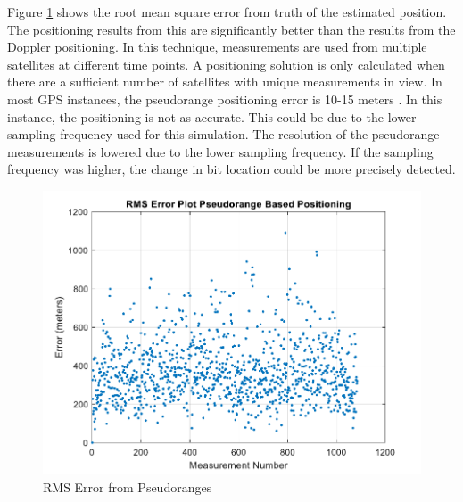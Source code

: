 \documentclass[12pt]{report}
\begin{document}
Figure \ref{fig:CleanPseudo15minIridRSME} shows the root mean square error from truth of the estimated position. The positioning results from this are significantly better than the results from the Doppler positioning. In this technique, measurements are used from multiple satellites at different time points. A positioning solution is only calculated when there are a sufficient number of satellites with unique measurements in view. In most GPS instances, the pseudorange positioning error is 10-15 meters \cite{misraGlobalPositioningSystem2012}. In this instance, the positioning is not as accurate. This could be due to the lower sampling frequency used for this simulation. The resolution of the pseudorange measurements is lowered due to the lower sampling frequency. If the sampling frequency was higher, the change in bit location could be more precisely detected. 
\begin{figure}[h!]
    \centering
    \includegraphics[width=5in]
    {15min_irid_clean_pseudo_rmse.pdf}
    \caption{RMS Error from Pseudoranges}
    \label{fig:CleanPseudo15minIridRSME}
\end{figure}
\end{document}
